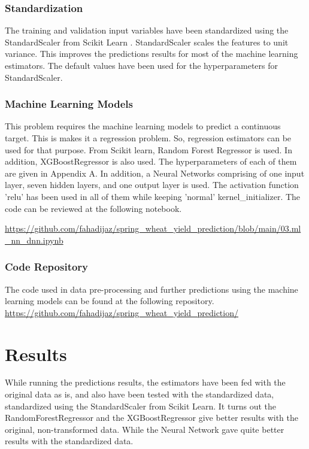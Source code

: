 \documentclass[sigconf, nonacm, natbib, screen, balance=False]{acmart}
\begin{document}
\subsubsection{Standardization}\label{sec:aspect1}

The training and validation input variables have been standardized using the StandardScaler from Scikit Learn \cite{stand_scaler:online}. StandardScaler scales the features to unit variance. This improves the predictions results for most of the machine learning estimators. The default values have been used for the hyperparameters for StandardScaler. 

\subsubsection{Machine Learning Models}\label{sec:aspect1}

This problem requires the machine learning models to predict a continuous target. This is makes it a regression problem. So, regression estimators can be used for that purpose. From Scikit learn, Random Forest Regressor is used. In addition, XGBoostRegressor is also used. The hyperparameters of each of them are given in Appendix A.
In addition, a Neural Networks comprising of one input layer, seven hidden layers, and one output layer is used. The activation function 'relu' has been used in all of them while keeping 'normal' kernel\_initializer. The code can be reviewed at the following notebook.

\url{https://github.com/fahadijaz/spring\_wheat\_yield\_prediction/blob/main/03.ml_nn_dnn.ipynb}

\subsubsection{Code Repository}\label{sec:aspect1}

The code used in data pre-processing and further predictions using the machine learning models can be found at the following repository.
\url{https://github.com/fahadijaz/spring\_wheat\_yield\_prediction/}

\section{Results}\label{sec:aspect1}

While running the predictions results, the estimators have been fed with the original data as is, and also have been tested with the standardized data, standardized using the StandardScaler from Scikit Learn. It turns out the RandomForestRegressor and the XGBoostRegressor give better results with the original, non-transformed data. While the Neural Network gave quite better results with the standardized data.
\end{document}
